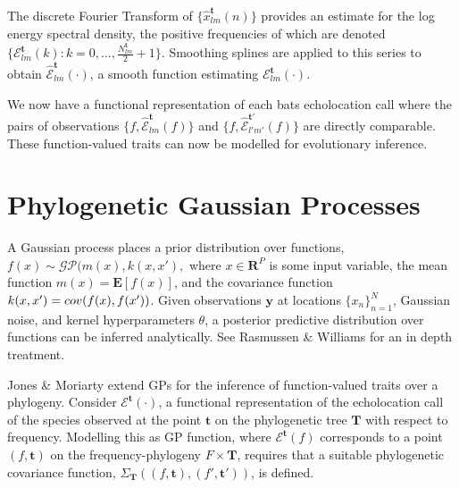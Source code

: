 \documentclass{ws-rv9x6}
\begin{document}
The discrete Fourier Transform\cite{antoniou2006digital}
of \(\{\hat{x}_{lm}^{\mathbf{t}}(n)\}\) provides an estimate for the log energy spectral density, the positive frequencies of which are denoted \(\{\mathcal{E}_{lm}^{\mathbf{t}}(k) : k = 0, \dots, \frac{ N_{lm}^{\mathbf{t}}}{2} + 1\}\). Smoothing splines\cite{friedman2001elements} are applied to this series to obtain \(\hat{\mathcal{E}}_{lm}^{\mathbf{t}}(\cdot)\), a smooth function estimating \(\mathcal{E}_{lm}^{\mathbf{t}}(\cdot)\).

We now have a functional representation of each bats echolocation call where the pairs of observations \(\{f, \hat{\mathcal{E}}_{lm}^{\mathbf{t}}(f)\}\) and \(\{f, \hat{\mathcal{E}}_{l'm'}^{{\mathbf{t}}'}(f)\}\) are directly comparable. These function-valued traits can now be modelled for evolutionary inference.

\section{Phylogenetic Gaussian Processes}
\label{sec:pgp}
A Gaussian process places a prior distribution over functions, \(f(x) \sim \mathcal{GP}(m(x), k (x, x'),\) where \(x \in \mathbf{R}^P\) is some input variable, the mean function \(m(x) = \mathbf{E}[f(x)]\), and the covariance function \(k(x, x') = \mathnormal{cov}(f(x), f(x') )\). Given observations \(\mathbf{y}\) at locations \(\{x_n\}_{n=1}^N\), Gaussian noise, and kernel hyperparameters \(\theta\), a posterior predictive distribution over functions can be inferred analytically. See Rasmussen \& Williams\cite{rasmussen2006gaussian} for an in depth treatment.   

Jones \& Moriarty\cite{jones2013evolutionary} extend GPs for the inference of function-valued traits over a phylogeny. Consider \(\mathcal{E}^{\mathbf{t}}(\cdot)\), a functional representation of the echolocation call of the species observed at the point \(\mathbf{t}\) on the phylogenetic tree \(\mathbf{T}\) with respect to frequency. Modelling this as GP function, where \(\mathcal{E}^{\mathbf{t}}(f)\) corresponds to a point \((f, \mathbf{t})\) on the frequency-phylogeny \(F \times \mathbf{T}\), requires that a suitable phylogenetic covariance function, \(\Sigma_{\mathbf{T}}\left((f,\mathbf{t}), (f',\mathbf{t}')\right)\), is defined.
\end{document}
